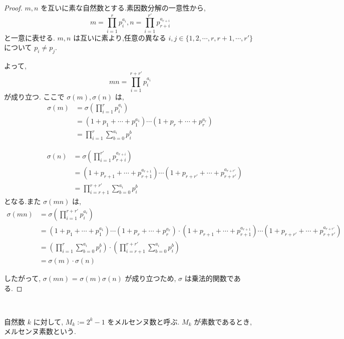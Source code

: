 \begin{proof}
\(m, n\) を互いに素な自然数とする.素因数分解の一意性から,
\[
m = \prod_{i=1}^{r}p_i^{a_i}, n = \prod_{i=1}^{r'}p_{r+i}^{a_{r+i}}
\]と一意に表せる.
\(m, n\) は互いに素より,任意の異なる \(i,j\in\{1, 2, \cdots, r, r+1, \cdots, r'\}\) について \(p_i \neq p_j\).

よって, \[mn = \prod_{i=1}^{r+r'}p_i^{a_i}\] が成り立つ.
ここで \(\sigma(m), \sigma(n)\) は,
\begin{align*}
\sigma(m) &= \sigma(\prod_{i=1}^{r}p_i^{a_i})\\
          &= (1 + p_1 + \cdots + p_1^{a_1}) \cdots (1 + p_r + \cdots + p_r^{a_r})\\
          &= \prod_{i=1}^{r}\sum_{b=0}^{a_i}p_i^{b}
\end{align*}

\begin{align*}
\;\;\;\;\;\;\;\;\;\;\;\;\;\;\;\sigma(n) &= \sigma(\prod_{i=1}^{r'}p_{r+i}^{a_{r+i}})\\
          &= (1 + p_{r+1} + \cdots + p_{r+1}^{a_{r+1}}) \cdots (1 + p_{r+r'} + \cdots + p_{r+r'}^{a_{r+r'}})\\
          &= \prod_{i=r+1}^{r+r'}\sum_{b=0}^{a_i}p_i^{b}
\end{align*}
となる.また \(\sigma(mn)\) は,
\begin{align*}
\sigma(mn) &= \sigma(\prod_{i=1}^{r+r'}p_i^{a_i})\\
           &= (1 + p_1 + \cdots + p_1^{a_1}) \cdots (1 + p_r + \cdots + p_r^{a_r})
              \cdot (1 + p_{r+1} + \cdots + p_{r+1}^{a_{r+1}}) \cdots (1 + p_{r+r'} + \cdots + p_{r+r'}^{a_{r+r'}})\\
           &= (\prod_{i=1}^{r}\sum_{b=0}^{a_i}p_i^{b}) \cdot (\prod_{i=r+1}^{r+r'}\sum_{b=0}^{a_i}p_i^{b})\\
           &= \sigma(m) \cdot \sigma(n)
\end{align*}

したがって, \(\sigma(mn)\) = \(\sigma(m)\sigma(n)\) が成り立つため, \(\sigma\) は乗法的関数である.
\end{proof}


\begin{definition}[メルセンヌ数]\label{mersenne}\leanok~\

自然数 \(k\) に対して, \(M_k := 2^k - 1\) をメルセンヌ数と呼ぶ. \(M_k\) が素数であるとき,メルセンヌ素数という.

\end{definition}


